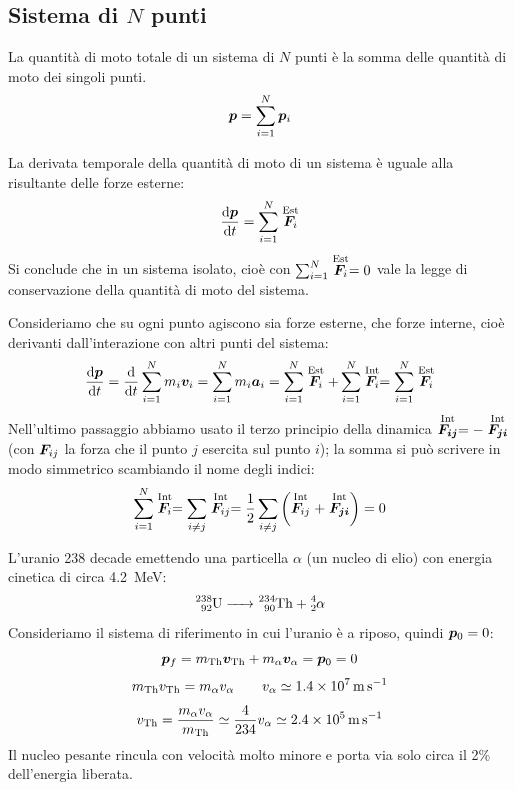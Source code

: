 \subsection{Sistema di \texorpdfstring{$N$}{N} punti}
\begin{Def}
  La quantità di moto totale di un sistema di $N$ punti è la somma delle quantità di moto dei singoli punti.
  \begin{equation}
    \boldsymbol{p}=\sum_{i=1}^N\boldsymbol{p}_i
  \end{equation}
\end{Def}
\begin{Teo}
  La derivata temporale della quantità di moto di un sistema è uguale alla risultante delle forze esterne:
  \begin{equation}
    \frac{\mathrm{d} \boldsymbol{p}}{\mathrm{d} t}=\sum^N_{i=1}\stackrel{\text{Est}}{\boldsymbol{F}_i}
  \end{equation}
 Si conclude che in un sistema isolato, cioè con
  $\sum^N_{i=1}\stackrel{\text{Est}}{\boldsymbol{F}_i}=0$ vale la legge di
  conservazione della quantità di moto del sistema.
\end{Teo}
Consideriamo che su ogni punto agiscono sia forze esterne, che forze interne, cioè derivanti dall'interazione con altri punti del sistema:
\[
  \frac{\mathrm{d} \boldsymbol{p}}{\mathrm{d} t}  =\frac{\mathrm{d} }{\mathrm{d} t}\sum^N_{i=1}m_i\boldsymbol{v}_i=\sum_{i=1}^{N}m_i\boldsymbol{a}_i
  =\sum^N_{i=1}\stackrel{\text{Est}}{\boldsymbol{F}_i}+\sum^N_{i=1}\stackrel{\text{Int}}{\boldsymbol{F}_i}=\sum^N_{i=1}\stackrel{\text{Est}}{\boldsymbol{F}_i}\]
Nell'ultimo passaggio abbiamo usato il terzo principio della dinamica $\stackrel{\text{Int}}{\boldsymbol{F_{ij}}} = -\stackrel{\text{Int}}{\boldsymbol{F_{ji}}}$ (con $\boldsymbol{F}_{ij}$ la forza che il punto $j$ esercita sul punto $i$); la somma si può scrivere in modo simmetrico scambiando il nome degli indici:
\[
  \sum^N_{i=1}\stackrel{\text{Int}}{\boldsymbol{F}_i} = \sum_{i\neq j}\stackrel{\text{Int}}{\boldsymbol{F}_{ij}} = \frac{1}{2}\sum_{i\neq j}\left(\stackrel{\text{Int}}{\boldsymbol{F}_{ij}} + \stackrel{\text{Int}}{\boldsymbol{F_{ji}}}\right) = 0
  \]

\begin{Es}[decadimento]
  L'uranio 238 decade emettendo una particella $\alpha$ (un nucleo di elio) con energia cinetica di circa \SI{4.2}{\mega\electronvolt}:
  \[\ce{^{238}_{92}U -> ^{234}_{90}Th + ^{4}_{2}\alpha}\]
  Consideriamo il sistema di riferimento in cui l'uranio è a riposo, quindi $\boldsymbol{p}_0=0$:
  \[\ve p_f=m_{\ce{Th}}\ve v_{\ce{Th}}+m_\alpha \ve v_\alpha=\ve p_0=0\]
  \[
    m_{\ce{Th}}v_{\ce{Th}}=m_\alpha v_\alpha\qquad v_\alpha\simeq\SI{1.4E7}{\metre\per\second}
  \]
  \[
    v_{\ce{Th}}=\frac{m_\alpha v_\alpha}{m_{\ce{Th}}}\simeq\frac{4}{234}v_\alpha\simeq\SI{2.4E5}{\metre\per\second}
  \]
  Il nucleo pesante rincula con velocità molto minore e porta via solo circa il 2\% dell'energia liberata.
\end{Es}

